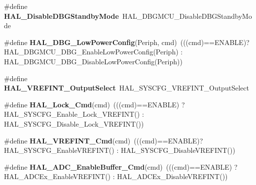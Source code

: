 \begin{DoxyCompactItemize}
\item 
\#define {\bfseries H\+A\+L\+\_\+\+Disable\+D\+B\+G\+Standby\+Mode}~H\+A\+L\+\_\+\+D\+B\+G\+M\+C\+U\+\_\+\+Disable\+D\+B\+G\+Standby\+Mode\hypertarget{group___h_a_l___aliased___functions_gac17bfe5c0df5508f778b7f3784b9723a}{}\label{group___h_a_l___aliased___functions_gac17bfe5c0df5508f778b7f3784b9723a}

\item 
\#define {\bfseries H\+A\+L\+\_\+\+D\+B\+G\+\_\+\+Low\+Power\+Config}(Periph,  cmd)~(((cmd)==E\+N\+A\+B\+LE)? H\+A\+L\+\_\+\+D\+B\+G\+M\+C\+U\+\_\+\+D\+B\+G\+\_\+\+Enable\+Low\+Power\+Config(Periph) \+: H\+A\+L\+\_\+\+D\+B\+G\+M\+C\+U\+\_\+\+D\+B\+G\+\_\+\+Disable\+Low\+Power\+Config(Periph))\hypertarget{group___h_a_l___aliased___functions_gaeece8fd3268534ce330c635222ce79a3}{}\label{group___h_a_l___aliased___functions_gaeece8fd3268534ce330c635222ce79a3}

\item 
\#define {\bfseries H\+A\+L\+\_\+\+V\+R\+E\+F\+I\+N\+T\+\_\+\+Output\+Select}~H\+A\+L\+\_\+\+S\+Y\+S\+C\+F\+G\+\_\+\+V\+R\+E\+F\+I\+N\+T\+\_\+\+Output\+Select\hypertarget{group___h_a_l___aliased___functions_ga2c3d2cdc9071cfc99696e78c29621852}{}\label{group___h_a_l___aliased___functions_ga2c3d2cdc9071cfc99696e78c29621852}

\item 
\#define {\bfseries H\+A\+L\+\_\+\+Lock\+\_\+\+Cmd}(cmd)~(((cmd)==E\+N\+A\+B\+LE) ? H\+A\+L\+\_\+\+S\+Y\+S\+C\+F\+G\+\_\+\+Enable\+\_\+\+Lock\+\_\+\+V\+R\+E\+F\+I\+NT() \+: H\+A\+L\+\_\+\+S\+Y\+S\+C\+F\+G\+\_\+\+Disable\+\_\+\+Lock\+\_\+\+V\+R\+E\+F\+I\+NT())\hypertarget{group___h_a_l___aliased___functions_ga72384357565be710258691efd3b3b72c}{}\label{group___h_a_l___aliased___functions_ga72384357565be710258691efd3b3b72c}

\item 
\#define {\bfseries H\+A\+L\+\_\+\+V\+R\+E\+F\+I\+N\+T\+\_\+\+Cmd}(cmd)~(((cmd)==E\+N\+A\+B\+LE)? H\+A\+L\+\_\+\+S\+Y\+S\+C\+F\+G\+\_\+\+Enable\+V\+R\+E\+F\+I\+NT() \+: H\+A\+L\+\_\+\+S\+Y\+S\+C\+F\+G\+\_\+\+Disable\+V\+R\+E\+F\+I\+NT())\hypertarget{group___h_a_l___aliased___functions_ga89195eed3652b3f7ce36e89f3cc8e3a6}{}\label{group___h_a_l___aliased___functions_ga89195eed3652b3f7ce36e89f3cc8e3a6}

\item 
\#define {\bfseries H\+A\+L\+\_\+\+A\+D\+C\+\_\+\+Enable\+Buffer\+\_\+\+Cmd}(cmd)~(((cmd)==E\+N\+A\+B\+LE) ? H\+A\+L\+\_\+\+A\+D\+C\+Ex\+\_\+\+Enable\+V\+R\+E\+F\+I\+NT() \+: H\+A\+L\+\_\+\+A\+D\+C\+Ex\+\_\+\+Disable\+V\+R\+E\+F\+I\+NT())\hypertarget{group___h_a_l___aliased___functions_ga2945c26e7b184a3ee89309906de33cd3}{}\label{group___h_a_l___aliased___functions_ga2945c26e7b184a3ee89309906de33cd3}


\end{DoxyCompactItemize}
